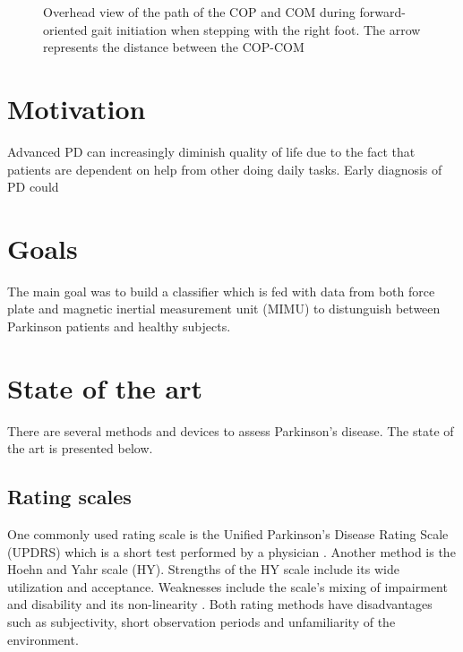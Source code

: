 \begin{figure}
	\centering
	\caption{Overhead view of the path of the COP and COM during forward-oriented gait initiation when stepping with the right foot. The arrow represents the distance between the COP-COM \cite{hass_gait_2005-1}}
	\label{fig:APAoverview}
\end{figure}


\section{Motivation}

Advanced PD can increasingly diminish quality of life due to the fact that patients are dependent on help from other doing daily tasks. Early diagnosis of PD could 


\section{Goals}

The main goal was to build a classifier which is fed with data from both force plate and magnetic inertial measurement unit (MIMU) to distunguish between Parkinson patients and healthy subjects.


\section{State of the art}

There are several methods and devices to assess Parkinson's disease. The state of the art is presented below.

\subsection{Rating scales}

One commonly used rating scale is the Unified Parkinson’s Disease Rating Scale (UPDRS) which is a short test performed by a physician \cite{klerk_long-term_2009}. Another method is the Hoehn and Yahr scale (HY). Strengths of the HY scale include its wide utilization and acceptance. Weaknesses include the scale's mixing of impairment and disability and its non-linearity \cite{goetz_movement_2004}. Both rating methods have disadvantages such as subjectivity, short observation periods and unfamiliarity of the environment.

